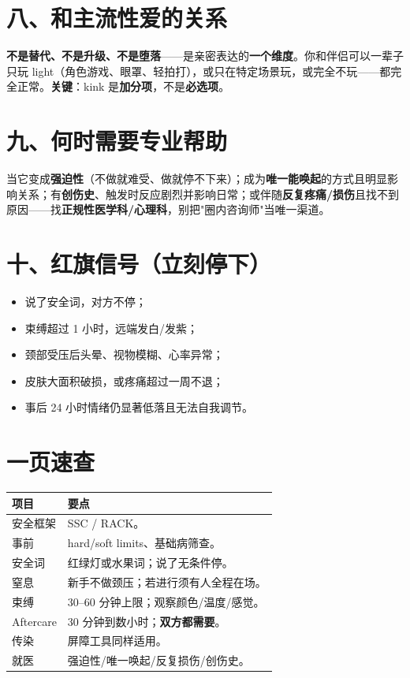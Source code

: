\documentclass[12pt,UTF8,openany]{ctexbook}
\begin{document}
\section{八、和主流性爱的关系}

\textbf{不是替代、不是升级、不是堕落}——是亲密表达的\textbf{一个维度}。你和伴侣可以一辈子只玩 light（角色游戏、眼罩、轻拍打），或只在特定场景玩，或完全不玩——都完全正常。\textbf{关键}：kink 是\textbf{加分项}，不是\textbf{必选项}。

\section{九、何时需要专业帮助}

当它变成\textbf{强迫性}（不做就难受、做就停不下来）；成为\textbf{唯一能唤起}的方式且明显影响关系；有\textbf{创伤史}、触发时反应剧烈并影响日常；或伴随\textbf{反复疼痛/损伤}且找不到原因——找\textbf{正规性医学科/心理科}，别把"圈内咨询师"当唯一渠道。

\section{十、红旗信号（立刻停下）}

\begin{itemize}
  \item 说了安全词，对方不停；
  \item 束缚超过 1 小时，远端发白/发紫；
  \item 颈部受压后头晕、视物模糊、心率异常；
  \item 皮肤大面积破损，或疼痛超过一周不退；
  \item 事后 24 小时情绪仍显著低落且无法自我调节。
\end{itemize}

\section{一页速查}

\begin{tabularx}{\textwidth}{lX}
\toprule
\textbf{项目} & \textbf{要点} \\
\midrule
安全框架 & SSC / RACK。 \\
事前 & hard/soft limits、基础病筛查。 \\
安全词 & 红绿灯或水果词；说了无条件停。 \\
窒息 & 新手不做颈压；若进行须有人全程在场。 \\
束缚 & 30--60 分钟上限；观察颜色/温度/感觉。 \\
Aftercare & 30 分钟到数小时；\textbf{双方都需要}。 \\
传染 & 屏障工具同样适用。 \\
就医 & 强迫性/唯一唤起/反复损伤/创伤史。 \\
\bottomrule
\end{tabularx}
\end{document}
